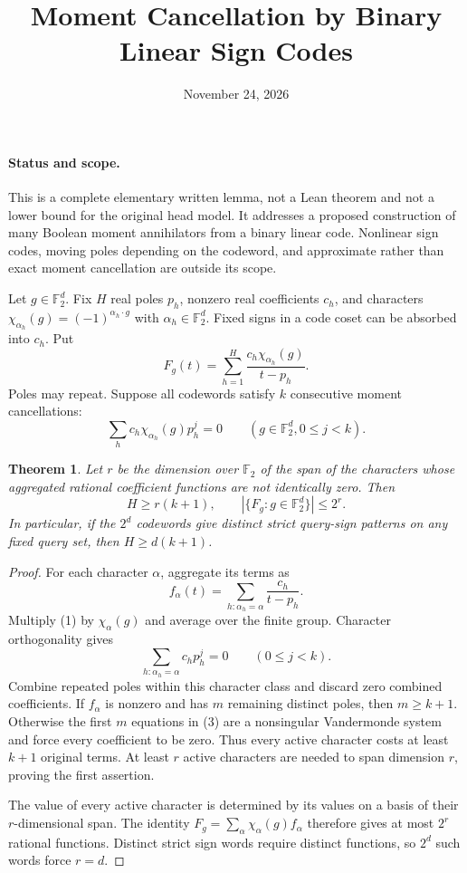 \documentclass[11pt]{article}
\title{Moment Cancellation by Binary Linear Sign Codes}
\author{}
\date{November 24, 2026}
\newtheorem{theorem}{Theorem}
\begin{document}
\maketitle

\paragraph{Status and scope.}
This is a complete elementary written lemma, not a Lean theorem and not
a lower bound for the original head model. It addresses a proposed
construction of many Boolean moment annihilators from a binary linear
code. Nonlinear sign codes, moving poles depending on the codeword,
and approximate rather than exact moment cancellation are outside its
scope.

Let $g\in\mathbb F_2^d$. Fix $H$ real poles $p_h$, nonzero real
coefficients $c_h$, and characters
$\chi_{\alpha_h}(g)=(-1)^{\alpha_h\cdot g}$ with
$\alpha_h\in\mathbb F_2^d$. Fixed signs in a code coset can be
absorbed into $c_h$. Put
\[
 F_g(t)=\sum_{h=1}^H\frac{c_h\chi_{\alpha_h}(g)}{t-p_h}.
\]
Poles may repeat. Suppose all codewords satisfy $k$ consecutive moment
cancellations:
\[
 \sum_h c_h\chi_{\alpha_h}(g)p_h^j=0
 \qquad(g\in\mathbb F_2^d, 0\leq j<k).
 \tag{1}
\]

\begin{theorem}
Let $r$ be the dimension over $\mathbb F_2$ of the span of the characters
whose aggregated rational coefficient functions are not identically
zero. Then
\[
 H\geq r(k+1),
 \qquad |\{F_g:g\in\mathbb F_2^d\}|\leq2^r.
 \tag{2}
\]
In particular, if the $2^d$ codewords give distinct strict query-sign
patterns on any fixed query set, then $H\geq d(k+1)$.
\end{theorem}
\begin{proof}
For each character $\alpha$, aggregate its terms as
\[
 f_\alpha(t)=\sum_{h:\alpha_h=\alpha}\frac{c_h}{t-p_h}.
\]
Multiply (1) by $\chi_\alpha(g)$ and average over the finite group.
Character orthogonality gives
\[
 \sum_{h:\alpha_h=\alpha}c_hp_h^j=0\qquad(0\leq j<k).
 \tag{3}
\]
Combine repeated poles within this character class and discard zero
combined coefficients. If $f_\alpha$ is nonzero and has $m$ remaining
distinct poles, then $m\geq k+1$. Otherwise the first $m$ equations in
(3) are a nonsingular Vandermonde system and force every coefficient
to be zero. Thus every active character costs at least $k+1$ original
terms. At least $r$ active characters are needed to span dimension $r$,
proving the first assertion.

The value of every active character is determined by its values on a
basis of their $r$-dimensional span. The identity
$F_g=\sum_\alpha\chi_\alpha(g)f_\alpha$ therefore gives at most
$2^r$ rational functions. Distinct strict sign words require distinct
functions, so $2^d$ such words force $r=d$.
\end{proof}
\end{document}
